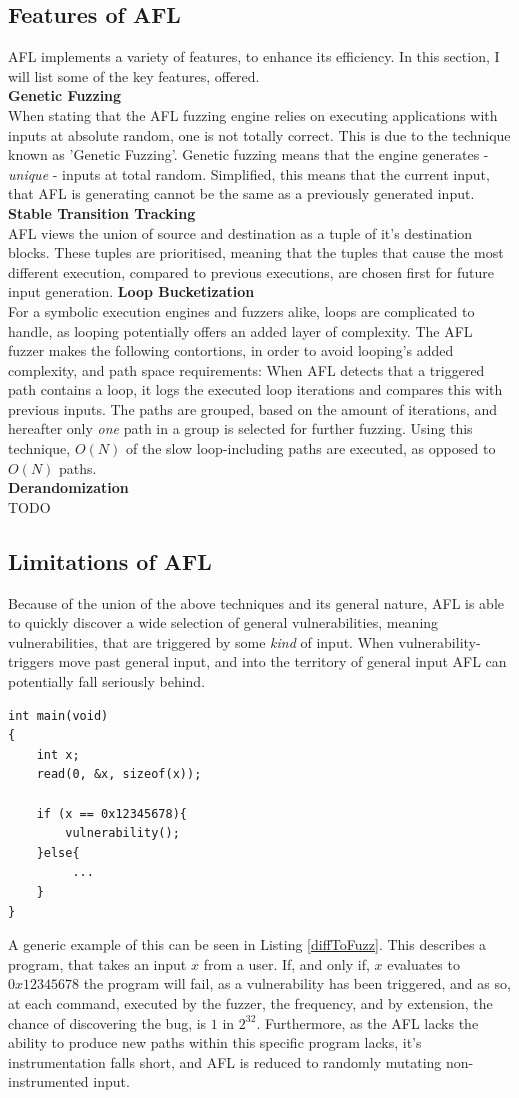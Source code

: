 \documentclass[a4paper]{article}
\newcommand{\tbf}[1]{\textbf{#1}}
\newcommand{\tit}[1]{\textit{#1}}
\newcommand{\subsubsubsection}[1]{\tbf{#1}\\}
\begin{document}
\subsection{Features of AFL}
AFL implements a variety of features, to enhance its efficiency. In this section, I will list some of the key features, offered.\\
\subsubsubsection{Genetic Fuzzing}
When stating that the AFL fuzzing engine relies on executing applications with inputs at absolute random, one is not totally correct. This is due to the technique known as 'Genetic Fuzzing'. Genetic fuzzing means that the engine generates - \tit{unique} - inputs at total random. Simplified, this means that the current input, that AFL is generating cannot be the same as a previously generated input.  
\subsubsubsection{Stable Transition Tracking}
AFL views the union of source and destination as a tuple of it's destination blocks. These tuples are prioritised, meaning that the tuples that cause the most different execution, compared to previous executions, are chosen first for future input generation.
\subsubsubsection{Loop Bucketization}
For a symbolic execution engines and fuzzers alike, loops are complicated to handle, as looping potentially offers an added layer of complexity. The AFL fuzzer makes the following contortions, in order to avoid looping's added complexity, and path space requirements:
When AFL detects that a triggered path contains a loop, it logs the executed loop iterations and compares this with previous inputs. The paths are grouped, based on the amount of iterations, and hereafter only \tit{one} path in a group is selected for further fuzzing. Using this technique, $O(N)$ of the slow loop-including paths are executed, as opposed to $O(N)$ paths.\\
\subsubsubsection{Derandomization}
TODO
\newpage
\subsection{Limitations of AFL}
Because of the union of the above techniques and its general nature, AFL is able to quickly discover a wide selection of general vulnerabilities, meaning vulnerabilities, that are triggered by some \tit{kind} of input. When vulnerability-triggers move past general input, and into the territory of general input AFL can potentially fall seriously behind.
\begin{lstlisting}[caption=A program that is difficult to fuzz, label=diffToFuzz, captionpos=b]
int main(void)
{
    int x;
    read(0, &x, sizeof(x));
    
    if (x == 0x12345678){
        vulnerability();
    }else{
         ...
    }
}
\end{lstlisting}
A generic example of this can be seen in Listing \ref{diffToFuzz}. This describes a program, that takes an input $x$ from a user. If, and only if, $x$ evaluates to $0x12345678$ the program will fail, as a vulnerability has been triggered, and as so, at each command, executed by the fuzzer, the frequency, and by extension, the chance of discovering the bug, is $1$ in $2^{32}$. Furthermore, as the AFL lacks the ability to produce new paths within this specific program lacks, it's instrumentation falls short, and AFL is reduced to randomly mutating non-instrumented input.
\end{document}
